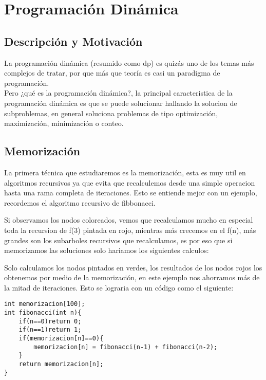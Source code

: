 \chapter{Programación Dinámica}
\section{Descripción y Motivación}

La programación dinámica (resumido como dp) es quizás uno de los temas más complejos de tratar, por que más que teoría es casi un paradigma de programación.
\\Pero ¿qué es la programación dinámica?, la principal caracteristica de la programación dinámica es que se puede solucionar hallando la solucion de subproblemas, en general soluciona problemas de tipo optimización, maximización, minimización o conteo.


\section{Memorización}
La primera técnica que estudiaremos es la memorización, esta es muy util en algoritmos recursivos ya que evita que recalculemos desde una simple operacion hasta una rama completa de iteraciones. Esto se entiende mejor con un ejemplo, recordemos el algoritmo recursivo de fibbonacci.


Si observamos los nodos coloreados, vemos que recalculamos mucho en especial toda la recursion de f(3) pintada en rojo, mientras más crecemos en el f(n), más grandes son los subarboles recursivos que recalculamos, es por eso que si memorizamos las soluciones solo hariamos los siguientes calculos:


Solo calculamos los nodos pintados en verdes, los resultados de los nodos rojos los obtenemos por medio de la memorización, en este ejemplo nos ahorramos más de la mitad de iteraciones. Esto se lograria con un código como el siguiente:

\begin{minipage}{\textwidth}
\begin{lstlisting}[style=C,caption=fibonacciMemorizacion.cpp]
int memorizacion[100];
int fibonacci(int n){
    if(n==0)return 0;
    if(n==1)return 1;
    if(memorizacion[n]==0){
        memorizacion[n] = fibonacci(n-1) + fibonacci(n-2);
    }
    return memorizacion[n];
}
\end{lstlisting}
\end{minipage}

